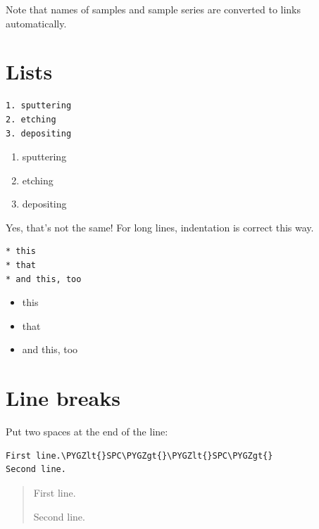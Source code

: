 \documentclass[a4paper,11pt,english]{sphinxmanual}
\def\PYGZlt{\char`\<}
\def\PYGZgt{\char`\>}
\begin{document}
Note that names of samples and sample series are converted to links
automatically.


\section{Lists}
\label{markdown:lists}
\begin{Verbatim}[commandchars=\\\{\},formatcom=\scriptsize]
1. sputtering
2. etching
3. depositing
\end{Verbatim}
\begin{enumerate}
\item {} 
sputtering

\item {} 
etching

\item {} 
depositing

\end{enumerate}

Yes, that's not the same!  \code{;-)} For long lines, indentation is correct this
way.

\begin{Verbatim}[commandchars=\\\{\},formatcom=\scriptsize]
* this
* that
* and this, too
\end{Verbatim}
\begin{itemize}
\item {} 
this

\item {} 
that

\item {} 
and this, too

\end{itemize}


\section{Line breaks}
\label{markdown:line-breaks}
Put two spaces at the end of the line:

\begin{Verbatim}[commandchars=\\\{\},formatcom=\scriptsize]
First line.\PYGZlt{}SPC\PYGZgt{}\PYGZlt{}SPC\PYGZgt{}
Second line.
\end{Verbatim}
\begin{quote}

\begin{DUlineblock}{0em}
\item[] First line.
\item[] Second line.
\end{DUlineblock}
\end{quote}
\end{document}
